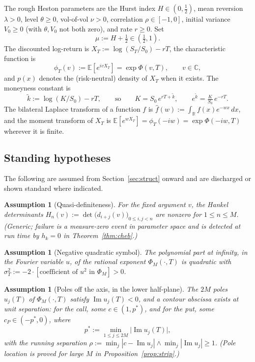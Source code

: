\documentclass[11pt]{article}
\newtheorem{assumption}[theorem]{Assumption}
\newcommand{\C}{\mathbb{C}}
\newcommand{\R}{\mathbb{R}}
\newcommand{\E}{\mathbb{E}}
\DeclareMathOperator{\Imag}{Im}
\begin{document}
The rough Heston parameters are the Hurst index $H\in(0,\tfrac12)$, mean
reversion $\lambda>0$, level $\theta\ge0$, vol-of-vol $\nu>0$, correlation
$\rho\in[-1,0]$, initial variance $V_0\ge0$ (with $\theta,V_0$ not both
zero), and rate $r\ge0$. Set
\begin{equation}\label{eq:mu-def}
\mu:=H+\tfrac12\in(\tfrac12,1).
\end{equation}
The discounted log-return is $X_T:=\log(S_T/S_0)-rT$, the characteristic
function is
\begin{equation}\label{eq:cf-def}
\phi_T(v):=\E\!\left[e^{ivX_T}\right]=\exp\Phi(v,T),\qquad v\in\C,
\end{equation}
and $p(x)$ denotes the (risk-neutral) density of $X_T$ when it exists. The
moneyness constant is
\begin{equation}\label{eq:ktilde}
\tilde k:=\log(K/S_0)-rT,\qquad\text{so}\qquad
K=S_0\,e^{rT+\tilde k},\qquad e^{\tilde k}=\tfrac{K}{S_0}\,e^{-rT}.
\end{equation}
The bilateral Laplace transform of a function $f$ is
$\hat f(w):=\int_\R f(x)e^{-wx}\,dx$, and the moment transform of $X_T$ is
$\E[e^{wX_T}]=\phi_T(-iw)=\exp\Phi(-iw,T)$ wherever it is finite.

\subsection{Standing hypotheses}

The following are assumed from Section~\ref{sec:struct} onward and are
discharged or shown standard where indicated.

\begin{assumption}[Quasi-definiteness]\label{A1}
For the fixed argument $v$, the Hankel determinants
$H_n(v):=\det\bigl(d_{i+j}(v)\bigr)_{0\le i,j<n}$ are nonzero for
$1\le n\le M$. \textup{(Generic; failure is a measure-zero event in
parameter space and is detected at run time by $h_k=0$ in
Theorem~\ref{thm:cheb}.)}
\end{assumption}

\begin{assumption}[Negative quadratic symbol]\label{A2}
The polynomial part at infinity, in the Fourier variable $u$, of the
rational exponent $\Phi_M(\cdot,T)$ is quadratic with
$\sigma_T^2:=-2\cdot[\text{coefficient of }u^2\text{ in }\Phi_M]>0$.
\end{assumption}

\begin{assumption}[Poles off the axis, in the lower half-plane]\label{A3}
The $2M$ poles $u_j(T)$ of $\Phi_M(\cdot,T)$ satisfy $\Imag u_j(T)<0$, and
a contour abscissa exists at unit separation: for the call, some
$c\in(1,p^*)$, and for the put, some $c_P\in(-p^*,0)$, where
\begin{equation}\label{eq:pstar}
p^*:=\min_{1\le j\le 2M}\bigl|\Imag u_j(T)\bigr|,
\end{equation}
with the running separation $\rho:=\min_j|c-\Imag u_j|\wedge\min_j
|\Imag u_j|\ge1$. \textup{(Pole location is proved for large $M$ in
Proposition~\ref{prop:strip}.)}
\end{assumption}
\end{document}
